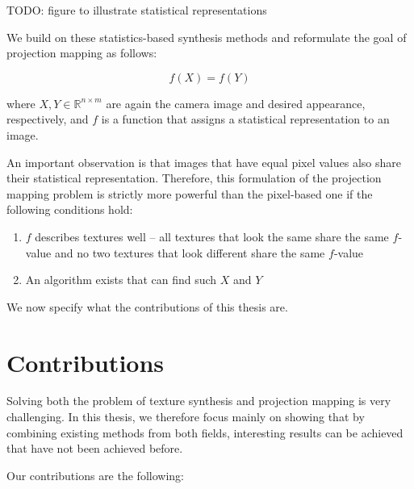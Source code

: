 {\color{red} TODO: figure to illustrate statistical representations}

We build on these statistics-based synthesis methods and reformulate the goal of projection mapping as follows:

\begin{equation}
    \label{eq:projection_mapping-statistics}
    f(X) = f(Y)
\end{equation}

where \(X,Y \in \mathbb{R}^{n \times m}\) are again the camera image and desired appearance, respectively, and \(f\) is a function that assigns a statistical representation to an image.

An important observation is that images that have equal pixel values also share their statistical representation. Therefore, this formulation of the projection mapping problem is strictly more powerful than the pixel-based one if the following conditions hold:

\begin{enumerate}
    \item \(f\) describes textures well -- all textures that look the same share the same \(f\)-value and no two textures that look different share the same \(f\)-value
    \item An algorithm exists that can find such \(X\) and \(Y\)
\end{enumerate}

We now specify what the contributions of this thesis are.

\section{Contributions}
\label{section:intro-contributions}

Solving both the problem of texture synthesis and projection mapping is very challenging. In this thesis, we therefore focus mainly on showing that by combining existing methods from both fields, interesting results can be achieved that have not been achieved before.

Our contributions are the following:

